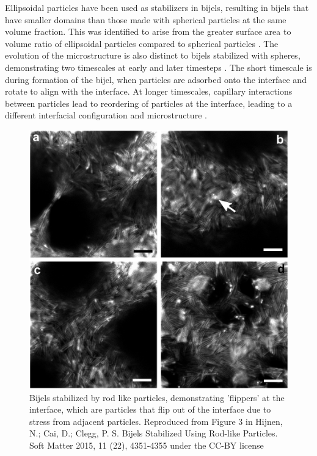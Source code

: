 Ellipsoidal particles have been used as stabilizers in bijels, resulting in bijels that have smaller domains than those made with spherical particles at the same volume fraction. This was identified 
to arise from the greater surface area to volume ratio of ellipsoidal particles compared to spherical particles \cite{gunther_timescales_2014}. The evolution of the microstructure is also distinct 
to bijels stabilized with spheres, demonstrating two timescales at early and later timesteps \cite{gunther_timescales_2014}. The short timescale is during formation of the bijel, when particles 
are adsorbed onto the interface and rotate to align with the interface. At longer timescales, capillary interactions between particles lead to reordering of particles at the interface, leading 
to a different interfacial configuration and microstructure \cite{gunther_timescales_2014}. 

\begin{figure}
    \centering
    \includegraphics[scale = 0.3]{../figures/literature_review/rods_bijels.png}
    \caption{Bijels stabilized by rod like particles, demonstrating 'flippers' at the interface, which are particles that flip out of the interface due to stress from adjacent particles. 
             Reproduced from Figure 3 in Hijnen, N.; Cai, D.; Clegg, P. S. Bijels Stabilized Using Rod-like Particles. Soft Matter 2015, 11 (22), 4351-4355 under the CC-BY license}
    \label{fig:rod_bijel_flippers}
\end{figure}


